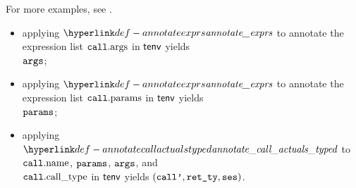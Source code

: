 For more examples, see .

\ProseParagraph
\AllApply
\begin{itemize}
  \item applying $\annotateexprlist$ to annotate the expression list $\vcall.\callargs$ in $\tenv$ yields \\
        $\args$\ProseOrTypeError;
  \item applying $\annotateexprlist$ to annotate the expression list $\vcall.\callparams$ in $\tenv$ yields \\
        $\params$\ProseOrTypeError;
  \item applying $\annotatecallactualstyped$ to $\vcall.\callname$, $\params$, $\args$, and \\
        $\vcall.\callcalltype$ in $\tenv$ yields $(\vcallp, \retty, \vses)$\ProseOrTypeError.
\end{itemize}

\FormallyParagraph
\begin{mathpar}
\end{mathpar}
  
    
    
  

